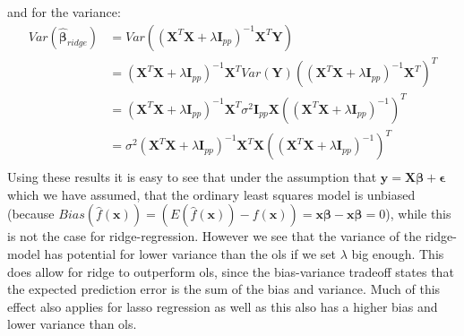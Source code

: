 \documentclass{article}
\begin{document}
and for the variance:
\begin{align*}
    Var(\hat{\bm{\beta}}_{ridge}) & = Var((\mathbf{X}^T \mathbf{X} + \lambda \mathbf{I}_{p p})^{-1} \mathbf{X}^T \mathbf{Y})                                                                                    \\
                                  & = (\mathbf{X}^T \mathbf{X} + \lambda \mathbf{I}_{p p})^{-1} \mathbf{X}^T Var(\mathbf{Y})  ((\mathbf{X}^T \mathbf{X} + \lambda \mathbf{I}_{p p})^{-1} \mathbf{X}^T)^T        \\
                                  & = (\mathbf{X}^T \mathbf{X} + \lambda \mathbf{I}_{p p})^{-1} \mathbf{X}^T \sigma^2 \mathbf{I}_{p p} \mathbf{X} ((\mathbf{X}^T \mathbf{X} + \lambda \mathbf{I}_{p p})^{-1})^T \\
                                  & = \sigma^2 (\mathbf{X}^T \mathbf{X} + \lambda \mathbf{I}_{p p})^{-1} \mathbf{X}^T \mathbf{X} ((\mathbf{X}^T \mathbf{X} + \lambda \mathbf{I}_{p p})^{-1})^T                  \\
\end{align*}
Using these results it is easy to see that under the assumption that $\mathbf{y}
    = \mathbf{X}\bm{\beta} + \bm{\epsilon}$ which we have assumed, that the ordinary
least squares model is unbiased (because $Bias(\hat{f}(\mathbf{x})) = (E(\hat{f}(\mathbf{x})) -
    f(\mathbf{x})) = \mathbf{x} \bm{\beta} - \mathbf{x} \bm{\beta} = 0$), while this is not the case for
ridge-regression. However we see that the variance of the ridge-model has
potential for lower variance than the ols if we set $\lambda$ big enough. This
does allow for ridge to outperform ols, since the bias-variance tradeoff states
that the expected prediction error is the sum of the bias and variance. Much of
this effect also applies for lasso regression as well as this also has a higher
bias and lower variance than ols.
\end{document}
